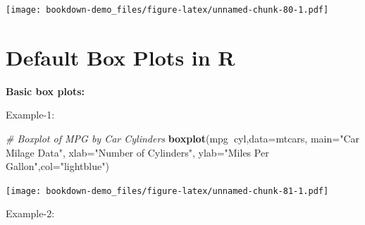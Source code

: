 \documentclass[]{book}
\newenvironment{Shaded}{\begin{snugshade}}{\end{snugshade}}
\newcommand{\KeywordTok}[1]{\textcolor[rgb]{0.13,0.29,0.53}{\textbf{#1}}}
\newcommand{\DataTypeTok}[1]{\textcolor[rgb]{0.13,0.29,0.53}{#1}}
\newcommand{\CharTok}[1]{\textcolor[rgb]{0.31,0.60,0.02}{#1}}
\newcommand{\StringTok}[1]{\textcolor[rgb]{0.31,0.60,0.02}{#1}}
\newcommand{\CommentTok}[1]{\textcolor[rgb]{0.56,0.35,0.01}{\textit{#1}}}
\newcommand{\OperatorTok}[1]{\textcolor[rgb]{0.81,0.36,0.00}{\textbf{#1}}}
\newcommand{\NormalTok}[1]{#1}
\begin{document}
\begin{Shaded}
\end{Shaded}

\texttt{[image: bookdown-demo\_files/figure-latex/unnamed-chunk-80-1.pdf]}

\chapter{Default Box Plots in R}\label{default-box-plots-in-r}

\textbf{Basic box plots:}

Example-1:

\begin{Shaded}
\begin{Highlighting}[]
\CommentTok{# Boxplot of MPG by Car Cylinders }
\KeywordTok{boxplot}\NormalTok{(mpg}\OperatorTok{~}\NormalTok{cyl,}\DataTypeTok{data=}\NormalTok{mtcars, }\DataTypeTok{main=}\StringTok{"Car Milage Data"}\NormalTok{, }
   \DataTypeTok{xlab=}\StringTok{"Number of Cylinders"}\NormalTok{, }\DataTypeTok{ylab=}\StringTok{"Miles Per Gallon"}\NormalTok{,}\DataTypeTok{col=}\StringTok{"lightblue"}\NormalTok{)}
\end{Highlighting}
\end{Shaded}

\texttt{[image: bookdown-demo\_files/figure-latex/unnamed-chunk-81-1.pdf]}

Example-2:
\end{document}
